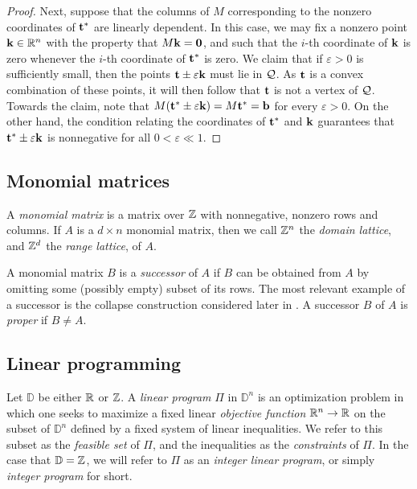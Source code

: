 \documentclass[11pt]{amsart}
\begin{document}
\begin{proof}
Next, suppose that the columns of $M$ corresponding to the nonzero coordinates of $\mathbf{t}^{\ast}$ are linearly dependent.   In this case, we may fix a nonzero point $\mathbf{k} \in \mathbb{R}^n$ with the property that $M \mathbf{k} = \mathbf{0}$, and such that the $i$-th coordinate of $\mathbf{k}$ is zero whenever the $i$-th coordinate of $\mathbf{t}^{\ast}$ is zero.  We claim that if $\varepsilon > 0$ is sufficiently small, then the points $\mathbf{t} \pm \varepsilon \mathbf{k}$ must lie in $\mathcal{Q}$.   As $\mathbf{t}$ is a convex combination of these points, it will then follow that $\mathbf{t}$ is not a vertex of $\mathcal{Q}$.  Towards the claim, note that $M(\mathbf{t}^{\ast} \pm \varepsilon \mathbf{k}) = M \mathbf{t}^{\ast} = \mathbf{b}$ for every $\varepsilon > 0$.  On the other hand, the condition relating the coordinates of $\mathbf{t}^{\ast}$ and $\mathbf{k}$ guarantees that $\mathbf{t}^{\ast} \pm \varepsilon \mathbf{k}$ is nonnegative for all $0 < \varepsilon \ll 1$.  
%
\end{proof}



\subsection{Monomial matrices}  A \emph{monomial matrix} is a matrix over $\mathbb{Z}$ with nonnegative, nonzero rows and columns.   If $A$ is a $d \times n$ monomial matrix, then we call $\mathbb{Z}^n$ the \emph{domain lattice}, and $\mathbb{Z}^d$ the \emph{range lattice}, of $A$.

A  monomial matrix $B$ is a \emph{successor} of $A$ if $B$ can be obtained from $A$ by omitting some (possibly empty) subset of its rows.   The most relevant example of a successor is the collapse construction considered later in .  A successor $B$ of $A$ is  \emph{proper} if $B \neq A$. 


\subsection{Linear programming}  

Let $\mathbb{D}$ be either $\mathbb{R}$ or $\mathbb{Z}$.  A \emph{linear program} $\Pi$ in $\mathbb{D}^n$ is an optimization problem in which one seeks to maximize a fixed linear \emph{objective function} $\mathbb{R}^n \to \mathbb{R}$ on the subset of $\mathbb{D}^n$ defined by a fixed system of linear inequalities.  We refer to this subset as the \emph{feasible set} of $\Pi$, and the inequalities as the \emph{constraints} of $\Pi$.  In the case that $\mathbb{D} = \mathbb{Z}$, we will refer to $\Pi$ as an \emph{integer linear program}, or simply \emph{integer program} for short.  
\end{document}
